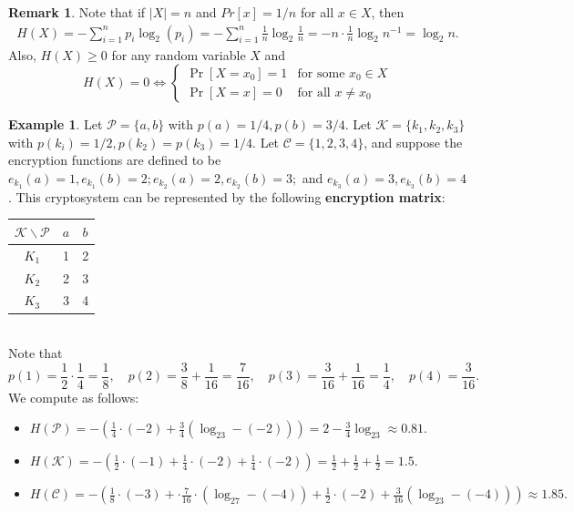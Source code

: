 \documentclass[12pt,openany]{book}
\theoremstyle{definition}
\newtheorem{remark}{Remark}[chapter]
\newtheorem{example}{Example}[chapter]
\newcommand{\of}[1]{\left(#1\right)}
\begin{document}
\begin{remark}
	Note that if \( |X| = n \) and \( Pr[x] = 1/n \) for all \( x \in X \), then 
	\begin{align*}
		H(X) = -\sum_{i=1}^{n} p_i \log_2(p_i)
		= -\sum_{i=1}^n\frac{1}{n}\log_2\frac{1}{n}
		=-n\cdot\frac{1}{n}\log_2n^{-1}
		=\log_2 n.
	\end{align*}
	Also, \( H(X) \geq 0 \) for any random variable \( X \) and \[H(X)=0\iff\begin{cases}
			\Pr[X=x_0]=1&\text{for some $x_0\in X$}\\
			\Pr[X=x]=0&\text{for all $x\neq x_0$}
		\end{cases}
	\]
\end{remark}
\vspace{8pt}
\begin{example}
	Let \( \mathcal{P} = \{a, b\} \) with \( p(a) = 1/4, p(b) = 3/4 \). Let \( \mathcal{K} = \{k_1, k_2, k_3\} \) with \( p(k_i) = 1/2, p(k_2) = p(k_3) = 1/4 \). Let \( \mathcal{C} = \{1,2,3,4\} \), and suppose the encryption functions are defined to be \( e_{k_1}(a) = 1, e_{k_1}(b) = 2; e_{k_2}(a) = 2, e_{k_2}(b) = 3; \) and \( e_{k_3}(a) = 3, e_{k_3}(b) = 4 \). This cryptosystem can be represented by the following \textbf{encryption matrix}:\begin{table}[h!]\centering
	\begin{tabular}{c||c|c}
		$\mathcal{K}\backslash\mathcal{P}$& $a$ & $b$ \\
		\hline\hline
		\( K_1 \) & 1 & 2 \\
		\( K_2 \) & 2 & 3 \\
		\( K_3 \) & 3 & 4 \\
	\end{tabular}
\end{table}\\ Note that \[
p(1)=\frac{1}{2}\cdot\frac{1}{4}=\frac{1}{8},\quad p(2)=\frac{3}{8}+\frac{1}{16}=\frac{7}{16},\quad p(3)=\frac{3}{16}+\frac{1}{16}=\frac{1}{4},\quad p(4)=\frac{3}{16}.
\]We compute as follows: \begin{itemize}
\item $H(\mathcal{P})=-\of{\frac{1}{4}\cdot(-2)+\frac{3}{4}\of{\log_23-(-2)}}=2-\frac{3}{4}\log_23\approx 0.81.$
\item $H(\mathcal{K})=-\of{\frac{1}{2}\cdot(-1)+\frac{1}{4}\cdot(-2)+\frac{1}{4}\cdot(-2)}=\frac{1}{2}+\frac{1}{2}+\frac{1}{2}=1.5.$
\item $H(\mathcal{C})=-\of{\frac{1}{8}\cdot(-3)+\cdot\frac{7}{16}\cdot\of{\log_27-(-4)}+\frac{1}{2}\cdot(-2)+\frac{3}{16}(\log_23-(-4))}\approx 1.85.$
\end{itemize}
\end{example}
\end{document}
